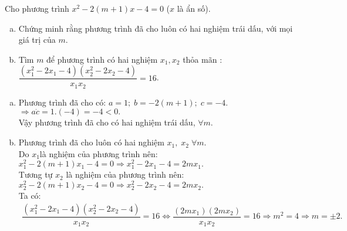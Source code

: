 	\begin{ex}%
		Cho phương trình $x^2-2(m+1)x-4=0$ ($x$ là ẩn số).
		\begin{enumerate}[a)]
			\item  Chứng minh rằng phương trình đã cho luôn có hai nghiệm trái dấu, với mọi giá trị của $m$.
			\item Tìm $m$ để phương trình có hai nghiệm $x_1, x_2$ thỏa mãn : $\dfrac{(x_1^2-2x_1-4)(x_2^2-2x_2-4)}{x_1x_2}=16$.
		\end{enumerate}
		\loigiai
		{
			\begin{enumerate}[a)]
				\item Phương trình đã cho có: $a=1;\;b=-2(m+1);\;c=-4.$\\$\Rightarrow a\dot{c}=1.(-4)=-4<0.$\\
						Vậy phương trình đã cho có hai nghiệm trái dấu, $\forall m.$
				\item  Phương trình đã cho luôn có hai nghiệm $x_1,\;x_2\;\forall m$.\\
					Do $x_1$là nghiệm của phương trình nên: $x_1^2-2(m+1)x_1-4=0 \Rightarrow x_1^2-2x_1-4=2mx_1.$\\
					Tương tự $x_2$ là nghiệm của phương trình nên: $x_2^2-2(m+1)x_2-4=0 \Rightarrow x_2^2-2x_2-4=2mx_2.$\\ Ta có:
					\begin{align*}
					\dfrac{(x_1^2-2x_1-4)(x_2^2-2x_2-4)}{x_1x_2}=16 \Leftrightarrow \dfrac{(2mx_1)(2mx_2)}{x_1x_2}=16 \Rightarrow m^2=4 \Rightarrow m=\pm {2}.
					\end{align*}
		\end{enumerate}}
	\end{ex}

